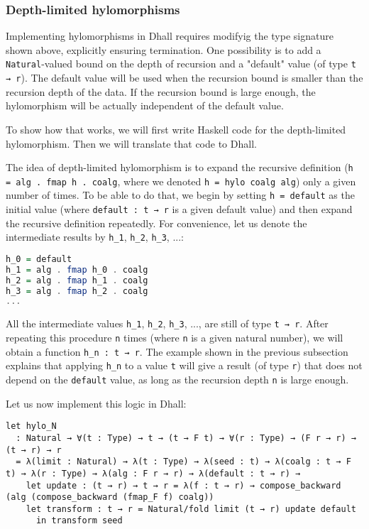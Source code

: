 \subsubsection{Depth-limited hylomorphisms}


Implementing hylomorphisms in Dhall requires modifyig the type signature shown above, explicitly ensuring termination.
One possibility is to add a \lstinline!Natural!-valued bound on the depth of recursion and a "default" value (of type \lstinline!t → r!).
The default value will be used when the recursion bound is smaller than the recursion depth of the data.
If the recursion bound is large enough, the hylomorphism will be actually independent of the default value.


To show how that works, we will first write Haskell code for the depth-limited hylomorphism.
Then we will translate that code to Dhall.


The idea of depth-limited hylomorphism is to expand the recursive definition (\lstinline!h = alg . fmap h . coalg!, where we denoted \lstinline!h = hylo coalg alg!) only a given number of times.
To be able to do that, we begin by setting \lstinline!h = default! as the initial value (where \lstinline!default : t → r! is a given default value) and then expand the recursive definition repeatedly.
For convenience, let us denote the intermediate results by \lstinline!h_1!, \lstinline!h_2!, \lstinline!h_3!, ...:


\begin{lstlisting}[language=Haskell]
h_0 = default 
h_1 = alg . fmap h_0 . coalg
h_2 = alg . fmap h_1 . coalg
h_3 = alg . fmap h_2 . coalg
...
\end{lstlisting}


All the intermediate values \lstinline!h_1!, \lstinline!h_2!, \lstinline!h_3!, ..., are still of type \lstinline!t → r!.
After repeating this procedure \lstinline!n! times (where \lstinline!n! is a given natural number), we will obtain a function \lstinline!h_n : t → r!.
The example shown in the previous subsection explains that applying \lstinline!h_n! to a value \lstinline!t! will give a result (of type \lstinline!r!) that does not depend on the \lstinline!default! value, as long as the recursion depth \lstinline!n! is large enough.


Let us now implement this logic in Dhall:


\begin{lstlisting}[language=Dhall]
let hylo_N
  : Natural → ∀(t : Type) → t → (t → F t) → ∀(r : Type) → (F r → r) → (t → r) → r
  = λ(limit : Natural) → λ(t : Type) → λ(seed : t) → λ(coalg : t → F t) → λ(r : Type) → λ(alg : F r → r) → λ(default : t → r) →
    let update : (t → r) → t → r = λ(f : t → r) → compose_backward (alg (compose_backward (fmap_F f) coalg))
    let transform : t → r = Natural/fold limit (t → r) update default
      in transform seed
\end{lstlisting}



